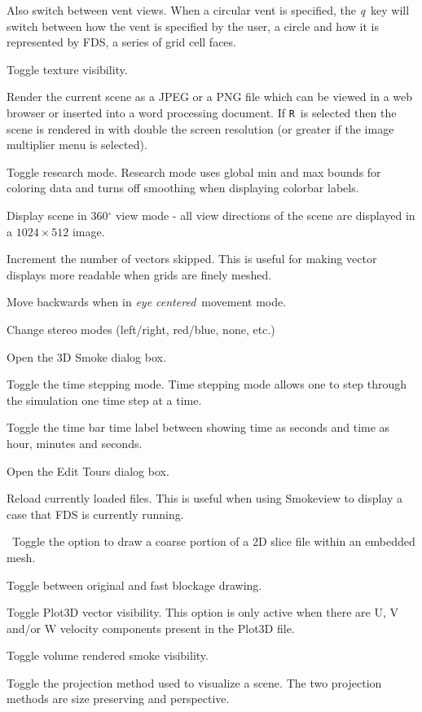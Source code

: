 \documentclass[11pt,twoside]{book}
\newcommand{\kitem}[1]{\item[{\bf {\tt #1 \  }} \hfill]}
\begin{document}
Also switch between vent views.  When a circular vent is specified,
the {\em q}\ key will switch between how the vent is specified by the user, a circle
and how it is represented by FDS, a series of grid cell faces.

\kitem{Q}Toggle texture visibility.

\kitem{r,R}Render the current scene as a JPEG or a PNG file which
can be viewed in a web browser or inserted into a word processing
document.  If {\tt R}\ is selected then the
scene is rendered in with double the screen resolution (or greater if the image multiplier menu is selected).

\kitem{ALT r}Toggle research mode.  Research mode uses global min
and max bounds for coloring data and turns off smoothing when displaying colorbar labels.

\kitem{ALT R}Display scene in 360$^\circ$ view mode - all view directions of the scene are displayed in a $1024\times 512$ image.

\kitem{s}Increment the number of vectors skipped. This is useful
for making vector displays more readable when grids are finely
meshed.

\kitem{s}Move backwards when in {\em eye centered}\ movement mode.

\kitem{S}Change stereo modes (left/right, red/blue, none, etc.)

\kitem{ALT s}Open the 3D Smoke dialog box.

\kitem{t}Toggle the time stepping mode.  Time stepping mode allows
one to step through the simulation one time step at a time.

\kitem{T}Toggle the time bar time label between showing time as seconds
and time as hour, minutes and seconds.

\kitem{ALT t}Open the Edit Tours dialog box.

\kitem{u}Reload currently loaded files.  This is useful when
using Smokeview to display a case that FDS is currently running.

\kitem{ALT u}\ Toggle the option to draw a coarse portion of a 2D
slice file within an embedded mesh.

\kitem{U}Toggle between original and fast blockage drawing.

\kitem{v}Toggle Plot3D vector visibility.  This option is only active
when there are U, V and/or W velocity components present in the
Plot3D file.

\kitem{V}Toggle volume rendered smoke visibility.

\kitem{ALT v}Toggle the projection method used to visualize a
scene. The two projection methods are size preserving and
perspective.
\end{document}
